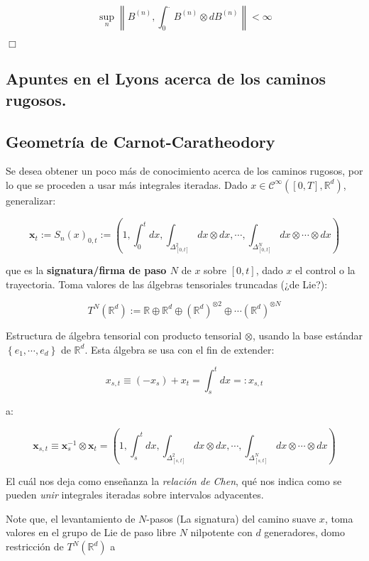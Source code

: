 \[
	\sup_n \left\lVert B^{(n)}, \int_0^{.} B^{(n)} \otimes dB^{(n)} \right\rVert < \infty
\]

\begin{flushright}
	$\Box$
\end{flushright}


\subsection{Apuntes en el Lyons acerca de los caminos rugosos.}


\subsection{Geometría de Carnot-Caratheodory}

Se desea obtener un poco más de conocimiento acerca de los caminos rugosos, por lo que se proceden a usar más integrales iteradas. Dado $x \in \mathcal{C}^{\infty} ([0,T], \mathbb{R}^d)$, generalizar:

\[
	\mathbf{x}_t := S_n (x)_{0, t} := \left( 1, \int_0^t dx, \int_{\Delta_{[0,t]}^2 } dx \otimes dx, \cdots, \int_{ \Delta_{[0,t]}^N  } dx \otimes \cdots \otimes dx \right)
\]

que es la \textbf{signatura/firma de paso $N$} de $x$ sobre $[0,t]$, dado $x$ el control o la trayectoria. Toma valores de las álgebras tensoriales truncadas (¿de Lie?):

\[
	T^N (\mathbb{R}^d) := \mathbb{R} \oplus \mathbb{R}^d \oplus \left( \mathbb{R}^d \right)^{\otimes 2} \oplus \cdots (\mathbb{R}^d)^{\otimes N}
\]

Estructura de álgebra tensorial con producto tensorial $\otimes$, usando la base estándar $\left\{ e_1, \cdots, e_d \right\}$ de $\mathbb{R}^d$. Esta álgebra se usa con el fin de extender:

\[
	x_{s,t} \equiv (-x_s) + x_t = \int_s^t dx =: x_{s,t}
\]


a:

\[
	\mathbf{x}_{s,t} \equiv \mathbf{x}_s^{-1} \otimes \mathbf{x}_t = \left( 1, \int_s^t dx, \int_{ \Delta_{[s,t]}^2 } dx \otimes dx, \cdots, \int_{ \Delta_{[s,t]}^N } dx \otimes \cdots \otimes dx \right)
\]

El cuál nos deja como enseñanza la \textit{relación de Chen}, qué nos indica como se pueden \textit{unir} integrales iteradas sobre intervalos adyacentes. 

Note que, el levantamiento de $N$-pasos (La signatura) del camino suave $x$, toma valores en el grupo de Lie de paso libre $N$ nilpotente con $d$ generadores, domo restricción de $T^N (\mathbb{R}^d)$ a 

